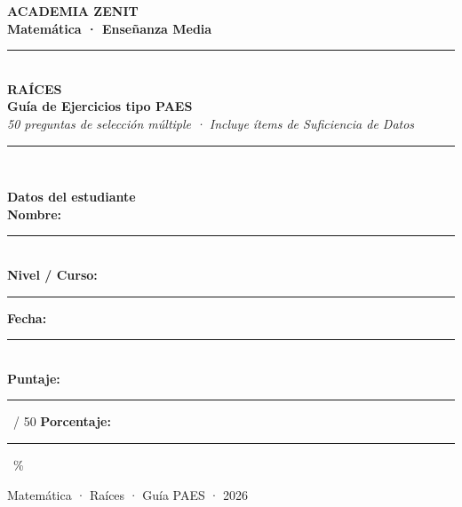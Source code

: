 \documentclass[11pt, letterpaper]{article}
\begin{document}

\thispagestyle{empty}
\vspace*{1.2cm}

\begin{center}
  {\Huge\bfseries\color{zenitnavy} ACADEMIA ZENIT}\\[0.5cm]
  {\large\bfseries\color{zenitblue} Matemática · Enseñanza Media}\\[0.8cm]
  \textcolor{zenitnavy}{\rule{0.74\linewidth}{1.8pt}}\\[0.6cm]
  {\fontsize{34}{40}\selectfont\bfseries\color{zenitnavy} RAÍCES}\\[0.25cm]
  {\LARGE\bfseries\color{zenitblue} Guía de Ejercicios tipo PAES}\\[0.25cm]
  {\large\color{zenitgold}\textit{50 preguntas de selección múltiple · Incluye ítems de Suficiencia de Datos}}\\[0.7cm]
  \textcolor{zenitnavy}{\rule{0.74\linewidth}{1.8pt}}\\[0.8cm]
\end{center}

\begin{center}
\begin{tcolorbox}[enhanced, width=0.82\linewidth,
  colback=white, colframe=zenitnavy, arc=6pt,
  left=18pt, right=18pt, top=12pt, bottom=12pt]
\begin{center}
{\bfseries\color{zenitnavy} Datos del estudiante}\\[10pt]
{\bfseries Nombre:}\;\rule{9.5cm}{0.5pt}\\[8pt]
{\bfseries Nivel / Curso:}\;\rule{3.5cm}{0.5pt}
\qquad\qquad
{\bfseries Fecha:}\;\rule{3.5cm}{0.5pt}\\[10pt]
{\bfseries Puntaje:}\;\rule{2cm}{0.5pt}\ / 50
\qquad
{\bfseries Porcentaje:}\;\rule{2cm}{0.5pt}\ \%
\end{center}
\end{tcolorbox}
\end{center}

\vfill
\begin{center}
{\color{zenitgold} Matemática · Raíces · Guía PAES · 2026}
\end{center}

\clearpage
\thispagestyle{empty}
\end{document}
